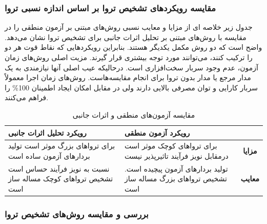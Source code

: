 \subsubsection{ مقایسه رویکردهای تشخیص تروا بر اساس اندازه نسبی تروا}
جدول زیر خلاصه ای از مزایا و معایب نسبی روش‌های مبتنی بر آزمون منطقی را در مقایسه با روش‌های مبتنی بر تحلیل اثرات جانبی برای تشخیص تروا نشان می‌دهد. واضح است که دو روش مکمل یکدیگر هستند. بنابراین رویکردهایی که نقاط قوت هر دو را ترکیب کنند، می‌توانند مورد توجه بیشتری قرار گیرند. مزیت اصلی روش‌های زمان آزمون، عدم وجود سربار سخت‌افزاری است. درحالیکه عیب اصلی آنها نیازمندی به یک مدار مرجع یا مدار بدون تروا برای انجام مقایسه‌هاست. روش‌های زمان اجرا معمولاً سربار کارایی و توان مصرفی بالایی دارند ولی در مقابل امکان ایجاد اطمینان 100\% را فراهم می‌کنند. 
\begin{table}[t]
	\label{tcomparisonls}
	\caption{مقایسه آزمون‌های منطقی و اثرات جانبی}
	\begin{center}
		\begin{tabular}{| p{4cm} | p{4cm} || c |}
			\hline
			\textbf{رویکرد تحلیل اثرات جانبی} & \textbf{رویکرد آزمون منطقی} & \\ \hline \hline
			برای تروا‌های بزرگ موثر است تولید بردارهای آزمون ساده است & برای تروا‌های کوچک موثر است درمقابل نویز فرآیند تاثیرپذیر نیست &\textbf{ مزایا} \\ \hline
			نسبت به نویز فرآیند حساس است تشخیص تروا‌های کوچک مساله ساز است & تولید بردارهای آزمون پیچیده است. تشخیص تروا‌های بزرگ مساله ساز است & \textbf{معایب} \\ \hline
		\end{tabular}
	\end{center}
\end{table}
\subsubsection{بررسی و مقایسه روش‌های تشخیص تروا}

